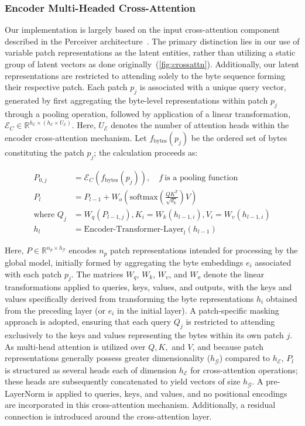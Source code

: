 \subsubsection{Encoder Multi-Headed Cross-Attention}
\label{sec:enc-cross-attn}
Our implementation is largely based on the input cross-attention component described in the Perceiver architecture~\citep{jaegle2021perceiver}. The primary distinction lies in our use of variable patch representations as the latent entities, rather than utilizing a static group of latent vectors as done originally~(\autoref{fig:crossattn}). Additionally, our latent representations are restricted to attending solely to the byte sequence forming their respective patch. Each patch $p_j$ is associated with a unique query vector, generated by first aggregating the byte-level representations within patch $p_j$ through a pooling operation, followed by application of a linear transformation, $\mathcal{E}_{C} \in \mathbb{R}^{h_{\mathcal{E}} \times (h_{\mathcal{E}} \times U_{\mathcal{E}})}$. Here, $U_{\mathcal{E}}$ denotes the number of attention heads within the encoder cross-attention mechanism. Let $f_{\text{bytes}}(p_j)$ be the ordered set of bytes constituting the patch $p_j$; the calculation proceeds as:

\begin{align}
P_{0,j} &= \mathcal{E}_{C}(f_\text{bytes}(p_j)), \quad f~\text{is a pooling function} \\
P_l &= P_{l-1} + W_o\left(\text{softmax}\left(\frac{QK^T}{\sqrt{d_k}}\right)V\right) \\
\text{where } Q_j &= W_q(P_{l-1,j}), K_i = W_k(h_{l-1,i}), V_i = W_v(h_{l-1,i}) \\
h_l &= \text{Encoder-Transformer-Layer}_l(h_{l-1})
\end{align}

Here, $P \in \mathbb{R}^{n_p \times h_{\mathcal{G}}}$ encodes $n_p$ patch representations intended for processing by the global model, initially formed by aggregating the byte embeddings $e_i$ associated with each patch $p_j$. The matrices $W_q$, $W_k$, $W_v$, and $W_o$ denote the linear transformations applied to queries, keys, values, and outputs, with the keys and values specifically derived from transforming the byte representations $h_i$ obtained from the preceding layer (or $e_i$ in the initial layer). A patch-specific masking approach is adopted, ensuring that each query $Q_j$ is restricted to attending exclusively to the keys and values representing the bytes within its own patch $j$. As multi-head attention is utilized over $Q, K,$ and $V$, and because patch representations generally possess greater dimensionality ($h_{\mathcal{G}}$) compared to $h_{\mathcal{E}}$, $P_l$ is structured as several heads each of dimension $h_{\mathcal{E}}$ for cross-attention operations; these heads are subsequently concatenated to yield vectors of size $h_{\mathcal{G}}$. A pre-LayerNorm is applied to queries, keys, and values, and no positional encodings are incorporated in this cross-attention mechanism. Additionally, a residual connection is introduced around the cross-attention layer.

